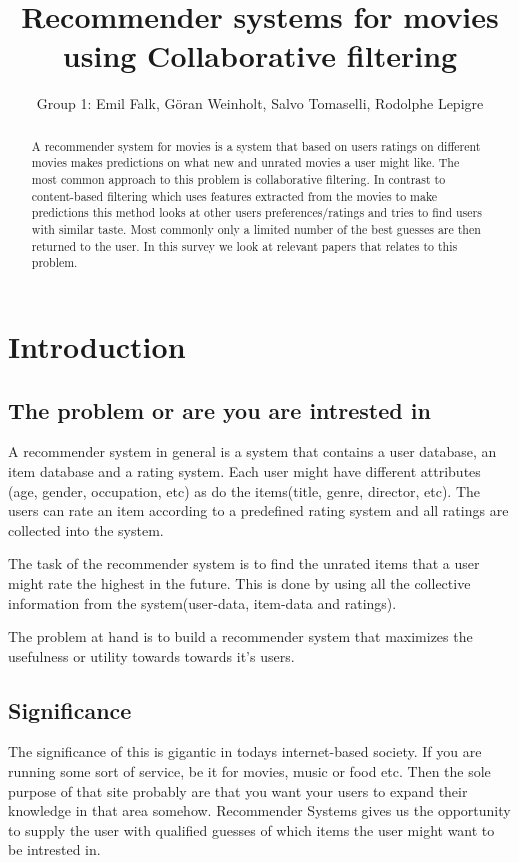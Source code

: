 \documentclass[a4paper,11pt]{article}
\begin{document}
\title{Recommender systems for movies using Collaborative filtering}
\author{Group 1: Emil Falk, Göran Weinholt, Salvo Tomaselli, Rodolphe Lepigre}

\maketitle
\begin{abstract}\centering
A recommender system for movies is a system that based on users
ratings on different movies makes predictions on what new and unrated
movies a user might like. The most common approach to this problem is
collaborative filtering. In contrast to content-based filtering which
uses features extracted from the movies to make predictions this method
looks at other users preferences/ratings and tries to find users with 
similar taste. Most commonly only a limited number of the best guesses
are then returned to the user. In this survey we look at relevant papers
that relates to this problem.
\end{abstract}

\section{Introduction}
\subsection{The problem or are you are intrested in}
A recommender system in general is a system that contains a user database,
an item database and a rating system. Each user might have different attributes
(age, gender, occupation, etc) as do the items(title, genre, director, etc). 
The users can rate an item according to a predefined rating system and all
ratings are collected into the system.

The task of the recommender system is to find the unrated items that a user 
might rate the highest in the future. This is done by using all the collective
information from the system(user-data, item-data and ratings).

The problem at hand is to build a recommender system that maximizes the usefulness
or utility towards towards it's users.
\subsection{Significance}
The significance of this is gigantic in todays internet-based society. If you are running some sort 
of service, be it for movies, music or food etc. Then the sole purpose of that site probably are that
you want your users to expand their knowledge in that area somehow. Recommender Systems gives us the
opportunity to supply the user with qualified guesses of which items the user might want to be 
intrested in.
\end{document}
